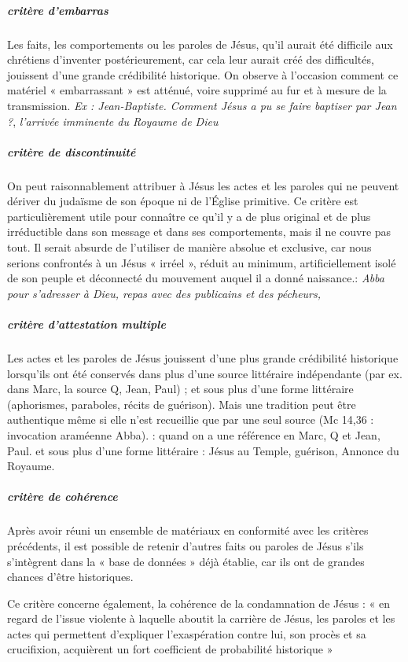 \subparagraph{critère d'embarras}
Les faits, les comportements ou les paroles de Jésus, qu'il aurait été
difficile aux chrétiens d'inventer postérieurement, car cela leur aurait
créé des difficultés, jouissent d'une grande crédibilité historique. On
observe à l'occasion comment ce matériel « embarrassant » est atténué,
voire supprimé au fur et à mesure de la transmission. \textit{Ex : Jean-Baptiste. Comment Jésus a pu se faire baptiser par Jean ?}, \textit{l'arrivée imminente du Royaume de Dieu}

\subparagraph{critère de discontinuité}
On peut raisonnablement attribuer à Jésus les actes et les paroles qui
ne peuvent dériver du judaïsme de son époque ni de l'Église primitive.
Ce critère est particulièrement utile pour connaître ce qu'il y a de
plus original et de plus irréductible dans son message et dans ses
comportements, mais il ne couvre pas tout. Il serait absurde de
l'utiliser de manière absolue et exclusive, car nous serions confrontés
à un Jésus « irréel », réduit au minimum, artificiellement isolé de son
peuple et déconnecté du mouvement auquel il a donné naissance.: \textit{Abba pour s'adresser à Dieu, repas avec des publicains et des pécheurs, }
\subparagraph{critère d'attestation multiple}
Les actes et les paroles de Jésus jouissent d'une plus grande
crédibilité historique lorsqu'ils ont été conservés dans plus d'une
source littéraire indépendante (par ex. dans Marc, la source Q, Jean,
Paul) ; et sous plus d'une forme littéraire (aphorismes, paraboles,
récits de guérison). Mais une tradition peut être authentique même si
elle n'est recueillie que par une seul source (Mc 14,36 : invocation
araméenne Abba). : quand on a une référence en Marc, Q et Jean, Paul. et sous plus d'une forme littéraire : Jésus au Temple, guérison, Annonce du Royaume. 
\subparagraph{critère de cohérence}
Après avoir réuni un ensemble de matériaux en conformité avec les
critères précédents, il est possible de retenir d'autres faits ou
paroles de Jésus s'ils s'intègrent dans la « base de données » déjà
établie, car ils ont de grandes chances d'être historiques.

Ce critère concerne également, la cohérence de la condamnation de Jésus
: « en regard de l'issue violente à laquelle aboutit la carrière de
Jésus, les paroles et les actes qui permettent d'expliquer
l'exaspération contre lui, son procès et sa crucifixion, acquièrent un
fort coefficient de probabilité historique » 

